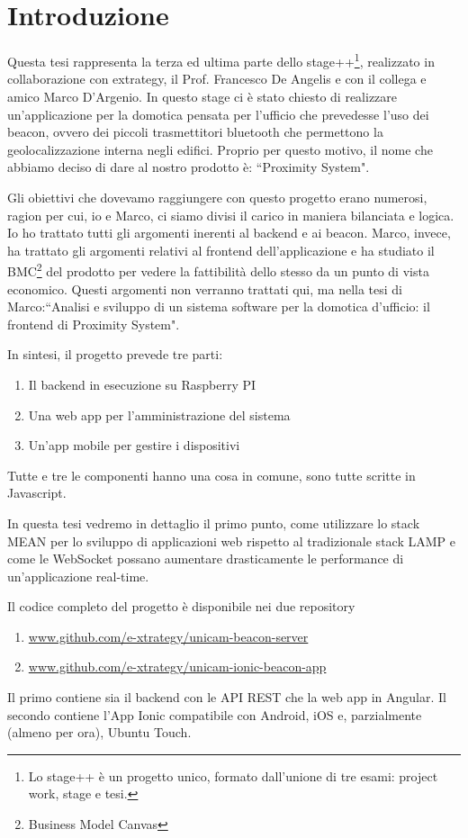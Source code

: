 \chapter{Introduzione}
\label{chap:intro}

Questa tesi rappresenta la terza ed ultima parte dello stage++\footnote{Lo stage++ è un progetto unico, formato dall'unione di tre esami: project work, stage e tesi.},
realizzato in collaborazione con extrategy, il Prof. Francesco De Angelis e con il collega e amico Marco D'Argenio.
In questo stage ci è stato chiesto di realizzare un'applicazione per la domotica pensata per l'ufficio che prevedesse l'uso dei beacon, ovvero dei piccoli trasmettitori bluetooth che permettono la geolocalizzazione interna negli edifici. 
Proprio per questo motivo, il nome che abbiamo deciso di dare al nostro prodotto è: “Proximity System".

Gli obiettivi che dovevamo raggiungere con questo progetto erano numerosi, ragion per cui, io e Marco, ci siamo divisi il carico in maniera bilanciata e logica.
Io ho trattato tutti gli argomenti inerenti al backend e ai beacon. 
Marco, invece, ha trattato gli argomenti relativi al frontend dell'applicazione e ha studiato il BMC\footnote{Business Model Canvas} del prodotto per vedere la fattibilità dello stesso da un punto di vista economico. 
Questi argomenti non verranno trattati qui, ma nella tesi di Marco:“Analisi e sviluppo di un sistema software per la domotica d'ufficio: il frontend di Proximity System".

In sintesi, il progetto prevede tre parti: 
\begin{enumerate}
\item Il backend in esecuzione su Raspberry PI
\item Una web app per l'amministrazione del sistema
\item Un'app mobile per gestire i dispositivi
\end{enumerate}
Tutte e tre le componenti hanno una cosa in comune, sono tutte scritte in Javascript.

In questa tesi vedremo in dettaglio il primo punto, come utilizzare lo stack MEAN per lo sviluppo di applicazioni web rispetto al tradizionale stack LAMP e come le WebSocket possano aumentare drasticamente le performance di un'applicazione real-time.

Il codice completo del progetto è disponibile nei due repository
\begin{enumerate}
\item \url{www.github.com/e-xtrategy/unicam-beacon-server}
\item \url{www.github.com/e-xtrategy/unicam-ionic-beacon-app}
\end{enumerate} 
Il primo contiene sia il backend con le API REST che la web app in Angular.
Il secondo contiene l'App Ionic compatibile con Android, iOS e, parzialmente (almeno per ora), Ubuntu Touch. 

